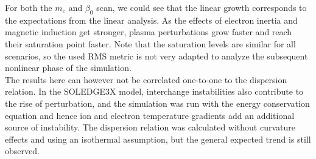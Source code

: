 For both the $m_e$ and $\beta_0$ scan, we could see that the linear growth corresponds to the expectations from the linear analysis. As the effects of electron inertia and magnetic induction get stronger, plasma perturbations grow faster and reach their saturation point faster. Note that the saturation levels are similar for all scenarios, so the used RMS metric is not very adapted to analyze the subsequent nonlinear phase of the simulation. \\

The results here can however not be correlated one-to-one to the dispersion relation. In the SOLEDGE3X model, interchange instabilities also contribute to the rise of perturbation, and the simulation was run with the energy conservation equation and hence ion and electron temperature gradients add an additional source of instability. The dispersion relation was calculated without curvature effects and using an isothermal assumption, but the general expected trend is still observed. 







